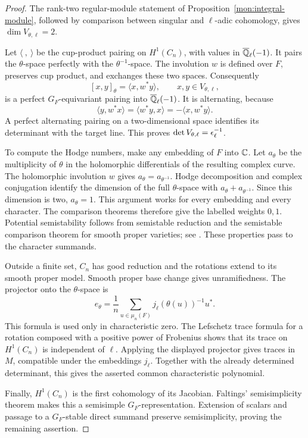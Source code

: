 \begin{proof}
The rank-two regular-module statement of
Proposition~\ref{mon:integral-module}, followed by comparison between
singular and \(\ell\)-adic cohomology, gives
$\dim V_{\theta,\ell}=2$.

Let $\langle\ ,\ \rangle$ be the cup-product pairing on $H^1(C_n)$,
with values in $\overline{\mathbb Q}_\ell(-1)$.  It pairs the $\theta$-space
perfectly with the $\theta^{-1}$-space.  The involution $w$ is defined
over $F$, preserves cup product, and exchanges these two spaces.
Consequently
\[
 [x,y]_\theta=\langle x,w^*y\rangle,
 \qquad x,y\in V_{\theta,\ell},
\]
is a perfect $G_F$-equivariant pairing into
$\overline{\mathbb Q}_\ell(-1)$.  It is alternating, because
\[
 \langle y,w^*x\rangle
   =\langle w^*y,x\rangle
   =-\langle x,w^*y\rangle.
\]
A perfect alternating pairing on a two-dimensional space identifies
its determinant with the target line.  This proves
$\det V_{\theta,\ell}=\epsilon_\ell^{-1}$.

To compute the Hodge numbers, make any embedding of $F$ into $\mathbb C$.
Let $a_\theta$ be the multiplicity of $\theta$ in the holomorphic
differentials of the resulting complex curve.  The holomorphic
involution $w$ gives $a_\theta=a_{\theta^{-1}}$.  Hodge decomposition
and complex conjugation identify the dimension of the full
$\theta$-space with $a_\theta+a_{\theta^{-1}}$.  Since this dimension
is two, $a_\theta=1$.  This argument works for every embedding and
every character.  The comparison theorems therefore give the labelled
weights $0,1$.  Potential semistability follows from semistable
reduction and the semistable comparison theorem for smooth proper
varieties; see \cite{Tsuji}.  These properties pass to the character
summands.

Outside a finite set, $C_n$ has good reduction and the rotations
extend to its smooth proper model.  Smooth proper base change gives
unramifiedness.  The projector onto the $\theta$-space is
\[
 e_\theta=\frac1n\sum_{u\in\mu_n(F)}
              j_\ell(\theta(u))^{-1}u^*.
\]
This formula is used only in characteristic zero.  The Lefschetz
trace formula for a rotation composed with a positive power of
Frobenius shows that its trace on $H^1(C_n)$ is independent of
$\ell$.  Applying the displayed projector gives traces in $M$,
compatible under the embeddings $j_\ell$.  Together with the
already determined determinant, this gives the asserted common
characteristic polynomial.

Finally, $H^1(C_n)$ is the first cohomology of its Jacobian.  Faltings'
semisimplicity theorem \cite[\S5, Satz~3]{Faltings} makes this a semisimple
$G_F$-representation.  Extension of scalars and passage to a
$G_F$-stable direct summand preserve semisimplicity, proving the
remaining assertion.
\end{proof}

